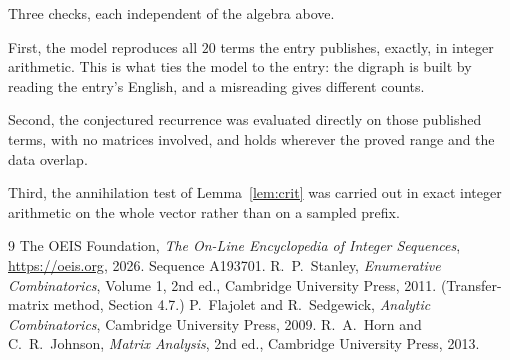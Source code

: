 \documentclass[11pt,a4paper]{article}
\theoremstyle{plain}
\theoremstyle{definition}
\begin{document}
Three checks, each independent of the algebra above.

First, the model reproduces all $20$ terms the entry publishes, exactly, in integer
arithmetic. This is what ties the model to the entry: the digraph is built by reading the
entry's English, and a misreading gives different counts.

Second, the conjectured recurrence was evaluated directly on those published terms, with no
matrices involved, and holds wherever the proved range and the data overlap.

Third, the annihilation test of Lemma~\ref{lem:crit} was carried out in exact integer
arithmetic on the whole vector rather than on a sampled prefix.

\begin{thebibliography}{9}
 The OEIS Foundation, \emph{The On-Line Encyclopedia of Integer
Sequences}, \url{https://oeis.org}, 2026. Sequence A193701.
 R.~P.~Stanley, \emph{Enumerative Combinatorics}, Volume 1, 2nd ed.,
Cambridge University Press, 2011. (Transfer-matrix method, Section 4.7.)
 P.~Flajolet and R.~Sedgewick, \emph{Analytic Combinatorics}, Cambridge
University Press, 2009.
 R.~A.~Horn and C.~R.~Johnson, \emph{Matrix Analysis}, 2nd ed., Cambridge
University Press, 2013.
\end{thebibliography}
\end{document}
